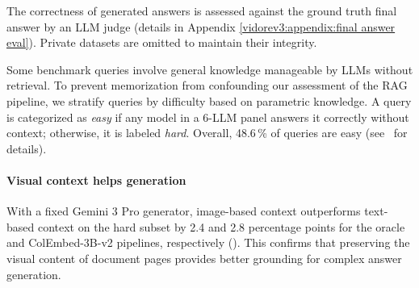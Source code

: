 
The correctness of generated answers is assessed against the ground truth final answer by an LLM judge (details in Appendix \ref{vidorev3:appendix:final answer eval}). 
Private datasets are omitted 
to maintain their integrity.

Some benchmark queries involve general knowledge manageable by LLMs without retrieval. To prevent memorization from confounding our assessment of the RAG pipeline, we stratify queries by difficulty based on parametric knowledge. A query is categorized as \textit{easy} if any model in a 6-LLM panel answers it correctly without context; otherwise, it is labeled \textit{hard}. Overall, 48.6\,\% of queries are easy (see~ for details).


\paragraph{Visual context helps generation} With a fixed Gemini 3 Pro generator, image-based context outperforms text-based context on the hard subset by 2.4 and 2.8 percentage points for the oracle and ColEmbed-3B-v2 pipelines, respectively (). This confirms that preserving the visual content of document pages provides better grounding for complex answer generation.

